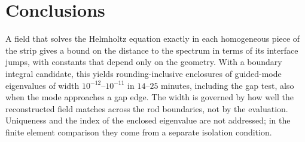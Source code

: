 \section{Conclusions}\label{sec:conclusion}
A field that solves the Helmholtz equation exactly in each homogeneous piece of
the strip gives a bound on the distance to the spectrum in terms of its interface
jumps, with constants that depend only on the geometry. With a boundary integral
candidate, this yields rounding-inclusive enclosures of guided-mode eigenvalues
of width $10^{-12}$--$10^{-11}$ in $14$--$25$ minutes, including the gap test,
also when the mode approaches a gap edge. The width is governed by how well the
reconstructed field matches across the rod boundaries, not by the evaluation.
Uniqueness and the index of the enclosed eigenvalue are not addressed; in the
finite element comparison they come from a separate isolation condition.
